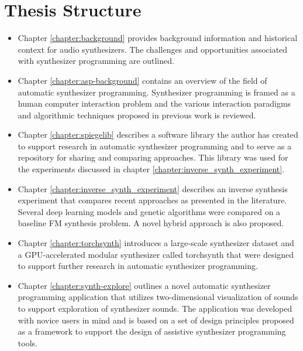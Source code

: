 \section{Thesis Structure}
\begin{itemize}
    \item Chapter \ref{chapter:background} provides background information and historical context for audio synthesizers. The challenges and opportunities associated with synthesizer programming are outlined.
    \item Chapter \ref{chapter:asp-background} contains an overview of the field of automatic synthesizer programming. Synthesizer programming is framed as a human computer interaction problem and the various interaction paradigms and algorithmic techniques proposed in previous work is reviewed.
    \item Chapter \ref{chapter:spiegelib} describes a software library the author has created to support research in automatic synthesizer programming and to serve as a repository for sharing and comparing approaches. This library was used for the experiments discussed in chapter \ref{chapter:inverse_synth_experiment}.
    \item Chapter \ref{chapter:inverse_synth_experiment} describes an inverse synthesis experiment that compares recent approaches as presented in the literature. Several deep learning models and genetic algorithms were compared on a baseline FM synthesis problem. A novel hybrid approach is also proposed.
    \item Chapter \ref{chapter:torchsynth} introduces a large-scale synthesizer dataset and a GPU-accelerated modular synthesizer called torchsynth that were designed to support further research in automatic synthesizer programming.
    \item Chapter \ref{chapter:synth-explore} outlines a novel automatic synthesizer programming application that utilizes two-dimensional visualization of sounds to support exploration of synthesizer sounds. The application was developed with novice users in mind and is based on a set of design principles proposed as a framework to support the design of assistive synthesizer programming tools.
\end{itemize}

